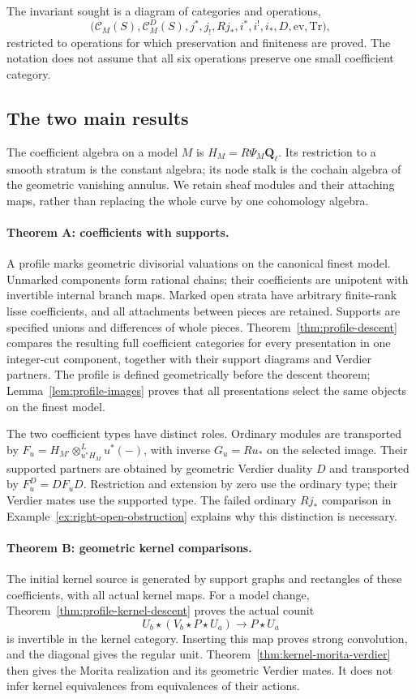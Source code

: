 \documentclass[11pt]{article}
\theoremstyle{definition}
\theoremstyle{remark}
\newcommand{\Qell}{\mathbf Q_\ell}
\begin{document}
The invariant sought is a diagram of categories and operations,
\[
 \bigl(\mathcal C_M(S),\mathcal C_M^D(S),
 j^*,j_!,Rj_*,i^*,i^!,i_*,D,\mathrm{ev},\mathrm{Tr}\bigr),
\]
restricted to operations for which preservation and finiteness are
proved.  The notation does not assume that all six operations preserve
one small coefficient category.

\subsection{The two main results}
The coefficient algebra on a model $M$ is $H_M=R\Psi_M\Qell$.
Its restriction to a smooth stratum is the constant algebra; its
node stalk is the cochain algebra of the geometric vanishing
annulus. We retain sheaf modules and their attaching maps, rather
than replacing the whole curve by one cohomology algebra.

\paragraph{Theorem A: coefficients with supports.}
A profile marks geometric divisorial valuations on the canonical
finest model. Unmarked components form rational chains; their
coefficients are unipotent with invertible internal branch maps.
Marked open strata have arbitrary finite-rank lisse coefficients,
and all attachments between pieces are retained. Supports are
specified unions and differences of whole pieces.
Theorem~\ref{thm:profile-descent} compares the resulting full
coefficient categories for every presentation in one integer-cut
component, together with their support diagrams and Verdier partners.
The profile is defined geometrically before the descent theorem;
Lemma~\ref{lem:profile-images} proves that all presentations select
the same objects on the finest model.

The two coefficient types have distinct roles. Ordinary modules
are transported by
$F_u=H_{M'}\otimes_{u^*H_M}^Lu^*(-)$, with inverse $G_u=Ru_*$
on the selected image. Their supported partners are obtained by
geometric Verdier duality $D$ and transported by $F_u^D=DF_uD$.
Restriction and extension by zero use the ordinary type; their
Verdier mates use the supported type. The failed ordinary $Rj_*$
comparison in Example~\ref{ex:right-open-obstruction} explains
why this distinction is necessary.

\paragraph{Theorem B: geometric kernel comparisons.}
The initial kernel source is generated by support graphs and
rectangles of these coefficients, with all actual kernel maps.
For a model change, Theorem~\ref{thm:profile-kernel-descent}
proves the actual counit
\[
 U_b\star(V_b\star P\star U_a)\longrightarrow P\star U_a
\]
is invertible in the kernel category. Inserting this map proves
strong convolution, and the diagonal gives the regular unit.
Theorem~\ref{thm:kernel-morita-verdier} then gives the Morita
realization and its geometric Verdier mates. It does not infer
kernel equivalences from equivalences of their actions.
\end{document}
